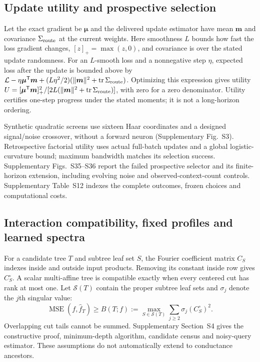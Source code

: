 \documentclass[11pt]{article}
\begin{document}
\subsection*{Update utility and prospective selection}

Let the exact gradient be $\bm\mu$ and the delivered update estimator have mean $\bm m$ and covariance $\Sigma_{\rm route}$ at the current weights. Here smoothness $L$ bounds how fast the loss gradient changes, $[z]_+=\max(z,0)$, and covariance is over the stated update randomness. For an $L$-smooth loss and a nonnegative step $\eta$, expected loss after the update is bounded above by $\mathcal L-\eta\bm\mu^{\mathsf T}\bm m+(L\eta^2/2)(\|\bm m\|^2+\operatorname{tr}\Sigma_{\rm route})$. Optimizing this expression gives utility $U=[\bm\mu^{\mathsf T}\bm m]_+^2/[2L(\|\bm m\|^2+\operatorname{tr}\Sigma_{\rm route})]$, with zero for a zero denominator. Utility certifies one-step progress under the stated moments; it is not a long-horizon ordering.

Synthetic quadratic screens use sixteen Haar coordinates and a designed signal/noise crossover, without a forward neuron (Supplementary Fig.~S3). Retrospective factorial utility uses actual full-batch updates and a global logistic-curvature bound; maximum bandwidth matches its selection success. Supplementary Figs.~S35--S36 report the failed prospective selector and its finite-horizon extension, including evolving noise and observed-context-count controls. Supplementary Table~S12 indexes the complete outcomes, frozen choices and computational costs.

\subsection*{Interaction compatibility, fixed profiles and learned spectra}

For a candidate tree $T$ and subtree leaf set $S$, the Fourier coefficient matrix $C_S$ indexes inside and outside input products. Removing its constant inside row gives $C_S^\circ$. A scalar multi-affine tree is compatible exactly when every centered cut has rank at most one. Let $\mathcal S(T)$ contain the proper subtree leaf sets and $\sigma_j$ denote the $j$th singular value:
\begin{equation}
\operatorname{MSE}(f,\widehat f_T)\geq B(T;f):=\max_{S\in\mathcal S(T)}\sum_{j\geq2}\sigma_j(C_S^\circ)^2.
\label{eq:morphologyselection}
\end{equation}
Overlapping cut tails cannot be summed. Supplementary Section~S4 gives the constructive proof, minimum-depth algorithm, candidate census and noisy-query estimator. These assumptions do not automatically extend to conductance ancestors.
\end{document}
